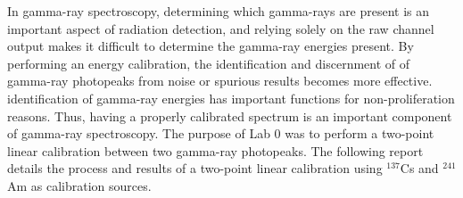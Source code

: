 In gamma-ray spectroscopy, determining which gamma-rays are present is an important aspect of
radiation detection, and relying solely on the raw channel output makes it difficult to determine the gamma-ray energies
present. By performing an energy calibration, the identification and discernment of
of gamma-ray photopeaks from noise or spurious results becomes more effective. identification
of gamma-ray energies has important functions for non-proliferation reasons. Thus, having
a properly calibrated spectrum is an important component of gamma-ray spectroscopy.
The purpose of Lab 0 was to perform a two-point linear calibration between two gamma-ray photopeaks. The following report
details the process and results of a two-point linear calibration using $^{137}$Cs and $^{241}$Am as
calibration sources.

